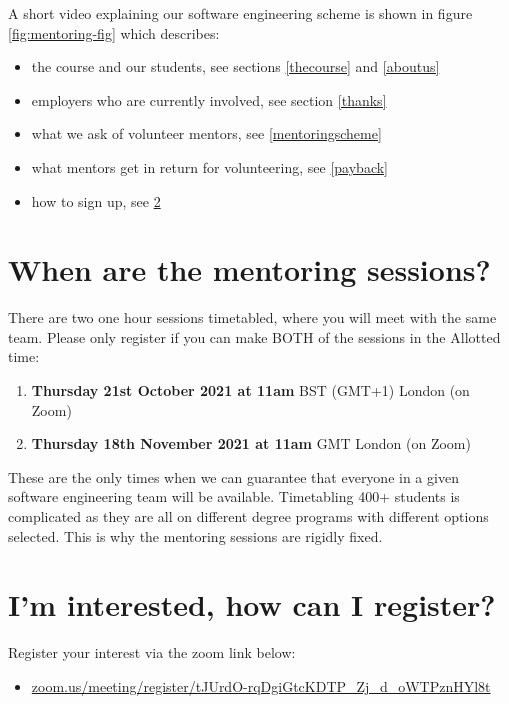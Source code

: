 \documentclass[
]{book}
\providecommand{\tightlist}{%
  \setlength{\itemsep}{0pt}\setlength{\parskip}{0pt}}
\begin{document}
A short video explaining our software engineering scheme is shown in figure \ref{fig:mentoring-fig} which describes:

\begin{itemize}
\tightlist
\item
  the course and our students, see sections \ref{thecourse} and \ref{aboutus}
\item
  employers who are currently involved, see section \ref{thanks}
\item
  what we ask of volunteer mentors, see \ref{mentoringscheme}
\item
  what mentors get in return for volunteering, see \ref{payback}
\item
  how to sign up, see \ref{registration}
\end{itemize}

\hypertarget{when}{%
\section{When are the mentoring sessions?}\label{when}}

There are two one hour sessions timetabled, where you will meet with the same team. Please only register if you can make BOTH of the sessions in the Allotted time:

\begin{enumerate}
\def\labelenumi{\arabic{enumi}.}
\tightlist
\item
  \textbf{Thursday 21st October 2021 at 11am} BST (GMT+1) London (on Zoom)
\item
  \textbf{Thursday 18th November 2021 at 11am} GMT London (on Zoom)
\end{enumerate}

These are the only times when we can guarantee that everyone in a given software engineering team will be available. Timetabling 400+ students is complicated as they are all on different degree programs with different options selected. This is why the mentoring sessions are rigidly fixed.

\hypertarget{registration}{%
\section{I'm interested, how can I register?}\label{registration}}

Register your interest via the zoom link below:

\begin{itemize}
\tightlist
\item
  \href{https://zoom.us/meeting/register/tJUrdO-rqDgiGtcKDTP_Zj_d_oWTPznHYl8t}{zoom.us/meeting/register/tJUrdO-rqDgiGtcKDTP\_Zj\_d\_oWTPznHYl8t}
\end{itemize}
\end{document}
